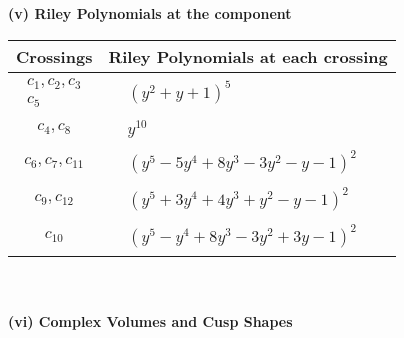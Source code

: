 \documentclass[1p]{elsarticle_modified}
\theoremstyle{definition}
\begin{document}
\newpage\renewcommand{\arraystretch}{1}
\flushleft \textbf{(v) Riley Polynomials at the component}\newline \\
\begin{tabular}{m{50pt}|m{274pt}}
Crossings & \hspace{64pt}Riley Polynomials at each crossing \\
\hline $$\begin{aligned}c_{1},c_{2},c_{3}\\c_{5}\end{aligned}$$&$\begin{aligned}
&(y^2+y+1)^5
\end{aligned}$\\
\hline $$\begin{aligned}c_{4},c_{8}\end{aligned}$$&$\begin{aligned}
&y^{10}
\end{aligned}$\\
\hline $$\begin{aligned}c_{6},c_{7},c_{11}\end{aligned}$$&$\begin{aligned}
&(y^5-5 y^4+8 y^3-3 y^2- y-1)^2
\end{aligned}$\\
\hline $$\begin{aligned}c_{9},c_{12}\end{aligned}$$&$\begin{aligned}
&(y^5+3 y^4+4 y^3+y^2- y-1)^2
\end{aligned}$\\
\hline $$\begin{aligned}c_{10}\end{aligned}$$&$\begin{aligned}
&(y^5- y^4+8 y^3-3 y^2+3 y-1)^2
\end{aligned}$\\
\hline
\end{tabular}\\~\\
\newpage\flushleft \textbf{(vi) Complex Volumes and Cusp Shapes}
\end{document}
